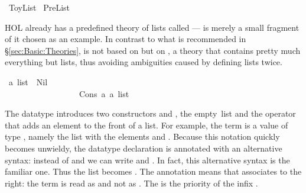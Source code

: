 %
\begin{isabellebody}%
\def\isabellecontext{ToyList}%
\ ToyList\isanewline
{}\ PreList\isanewline
{}\isamarkupfalse%
%
\begin{isamarkuptext}%
\noindent
HOL already has a predefined theory of lists called  ---
 is merely a small fragment of it chosen as an example. In
contrast to what is recommended in \S\ref{sec:Basic:Theories},
 is not based on  but on , a
theory that contains pretty much everything but lists, thus avoiding
ambiguities caused by defining lists twice.%
\end{isamarkuptext}%
\isamarkuptrue%
\ {\isacharprime}a\ list\ {\isacharequal}\ Nil\ \ \ \ \ \ \ \ \ \ \ \ \ \ \ \ \ \ \ \ \ \ \ \ \ \ {\isacharparenleft}{\isachardoublequote}{\isacharbrackleft}{\isacharbrackright}{\isachardoublequote}{\isacharparenright}\isanewline
\ \ \ \ \ \ \ \ \ \ \ \ \ \ \ \ \ {\isacharbar}\ Cons\ {\isacharprime}a\ {\isachardoublequote}{\isacharprime}a\ list{\isachardoublequote}\ \ \ \ \ \ \ \ \ \ \ \ {\isacharparenleft}\ {\isachardoublequote}{\isacharhash}{\isachardoublequote}\ {}{}{\isacharparenright}\isamarkupfalse%
%
\begin{isamarkuptext}%
\noindent
The datatype
 introduces two
constructors  and , the
empty~list and the operator that adds an element to the front of a list. For
example, the term  is a value of
type , namely the list with the elements  and
. Because this notation quickly becomes unwieldy, the
datatype declaration is annotated with an alternative syntax: instead of
 and  we can write
\isa{{\isacharbrackleft}{\isacharbrackright}} and
. In fact, this
alternative syntax is the familiar one.  Thus the list  becomes . The annotation
means that \isa{{\isacharhash}} associates to
the right: the term  is read as 
and not as .
The  is the priority of the infix \isa{{\isacharhash}}.


\end{isamarkuptext}
\end{isabellebody}
